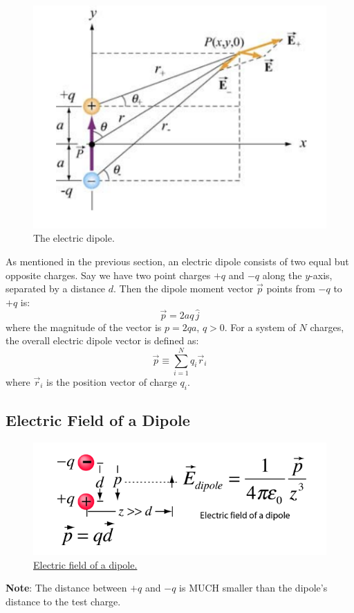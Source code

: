 \documentclass[11pt, letterpaper]{article}
\begin{document}
	\begin{figure}[h!]
		\centering
		\includegraphics[scale=0.7]{dipole}
		\caption{The electric dipole.}
		\label{fig:dipole}
	\end{figure}
	
	As mentioned in the previous section, an electric dipole consists of two equal but opposite 
	charges. Say we have two point charges $+q$ and $-q$ along the $y$-axis, separated by a 
	distance $d$. Then the dipole moment vector $\vec{p}$ points from $-q$ to $+q$ is:
	\begin{equation}\label{eqn:dipole}
		\boxed{\vec{p} = 2aq\,\hat{j}}
	\end{equation}
	where the magnitude of the vector is $p = 2qa$, $q > 0$. For a system of $N$ charges, the
	overall electric dipole vector is defined as:
		\[\vec{p} \equiv \displaystyle\sum_{i = 1}^{N} q_i\vec{r}_i\]
	where $\vec{r}_i$ is the position vector of charge $q_i$.
	
	\subsection{Electric Field of a Dipole}
	\begin{figure}[h!]
		\centering
		\includegraphics[scale=1.3]{dipole-field}
		\caption{\href{http://hyperphysics.phy-astr.gsu.edu/hbase/electric/dipole.html}{Electric
		field of a dipole.}}
		\label{fig:dipole-field}
	\end{figure}
	\noindent\textbf{Note}: The distance between $+q$ and $-q$ is MUCH smaller than the dipole's 
	distance to the test charge.
\end{document}
